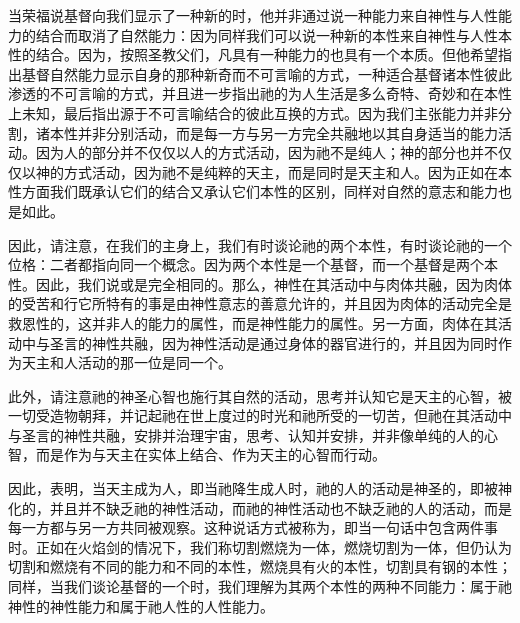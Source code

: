 当荣福说基督向我们显示了一种新的时，他并非通过说一种能力来自神性与人性能力的结合而取消了自然能力：因为同样我们可以说一种新的本性来自神性与人性本性的结合。因为，按照圣教父们，凡具有一种能力的也具有一个本质。但他希望指出基督自然能力显示自身的那种新奇而不可言喻的方式，一种适合基督诸本性彼此渗透的不可言喻的方式，并且进一步指出祂的为人生活是多么奇特、奇妙和在本性上未知，最后指出源于不可言喻结合的彼此互换的方式。因为我们主张能力并非分割，诸本性并非分别活动，而是每一方与另一方完全共融地以其自身适当的能力活动。因为人的部分并不仅仅以人的方式活动，因为祂不是纯人；神的部分也并不仅仅以神的方式活动，因为祂不是纯粹的天主，而是同时是天主和人。因为正如在本性方面我们既承认它们的结合又承认它们本性的区别，同样对自然的意志和能力也是如此。\par

因此，请注意，在我们的主身上，我们有时谈论祂的两个本性，有时谈论祂的一个位格：二者都指向同一个概念。因为两个本性是一个基督，而一个基督是两个本性。因此，我们说或是完全相同的。那么，神性在其活动中与肉体共融，因为肉体的受苦和行它所特有的事是由神性意志的善意允许的，并且因为肉体的活动完全是救恩性的，这并非人的能力的属性，而是神性能力的属性。另一方面，肉体在其活动中与圣言的神性共融，因为神性活动是通过身体的器官进行的，并且因为同时作为天主和人活动的那一位是同一个。\par

此外，请注意祂的神圣心智也施行其自然的活动，思考并认知它是天主的心智，被一切受造物朝拜，并记起祂在世上度过的时光和祂所受的一切苦，但祂在其活动中与圣言的神性共融，安排并治理宇宙，思考、认知并安排，并非像单纯的人的心智，而是作为与天主在实体上结合、作为天主的心智而行动。\par

因此，表明，当天主成为人，即当祂降生成人时，祂的人的活动是神圣的，即被神化的，并且并不缺乏祂的神性活动，而祂的神性活动也不缺乏祂的人的活动，而是每一方都与另一方共同被观察。这种说话方式被称为，即当一句话中包含两件事时。正如在火焰剑的情况下，我们称切割燃烧为一体，燃烧切割为一体，但仍认为切割和燃烧有不同的能力和不同的本性，燃烧具有火的本性，切割具有钢的本性；同样，当我们谈论基督的一个时，我们理解为其两个本性的两种不同能力：属于祂神性的神性能力和属于祂人性的人性能力。\par


